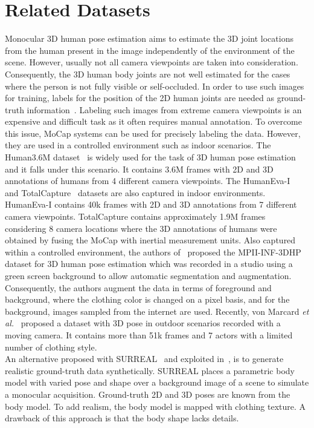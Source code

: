 \documentclass{article}
\begin{document}
\section{Related Datasets}
\label{sec:relateddatasets}
\vspace{-0.1cm}
Monocular 3D human pose estimation aims to estimate the 3D joint locations from the human present in the image independently of the environment of the scene. However, usually not all camera viewpoints are taken into consideration. Consequently, the 3D human body joints are not well estimated for the cases where the person is not fully visible or self-occluded. In order to use such images for training, labels for the position of the 2D human joints are needed as ground-truth information~\cite{andriluka20142d,johnson2010clustered}. Labeling such images from extreme camera viewpoints is an expensive and difficult task as it often requires manual annotation. To overcome this issue, MoCap systems can be used for precisely labeling the data. However, they are used in a controlled environment such as indoor scenarios. The Human3.6M dataset~\cite{h36m_pami} is widely used for the task of 3D human pose estimation and it falls under this scenario. It contains 3.6M frames with 2D and 3D annotations of humans from 4 different camera viewpoints. The HumanEva-I~\cite{sigal2010humaneva} and TotalCapture~\cite{trumble2017total} datasets are also captured in indoor environments. HumanEva-I contains 40k frames with 2D and 3D annotations from 7 different camera viewpoints. TotalCapture contains approximately 1.9M frames considering 8 camera locations where the 3D annotations of humans were obtained by fusing the MoCap with inertial measurement units. Also captured within a controlled environment, the authors of~\cite{mono-3dhp2017} proposed the MPII-INF-3DHP dataset for 3D human pose estimation which was recorded in a studio using a green screen background to allow automatic segmentation and augmentation. Consequently, the authors augment the data in terms of foreground and background, where the clothing color is changed on a pixel basis, and for the background, images sampled from the internet are used. Recently, von Marcard \textit{et al.}~\cite{vonMarcard2018} proposed a dataset with 3D pose in outdoor scenarios recorded with a moving camera. It contains more than 51k frames and 7 actors with a limited number of clothing style. \\
An alternative proposed with SURREAL~\cite{varol2017learning} and exploited in~\cite{pavlakos2018learning}, is to generate realistic ground-truth data synthetically. SURREAL places a parametric body model with varied pose and shape over a background image of a scene to simulate a monocular acquisition. Ground-truth 2D and 3D poses are known from the body model. To add realism, the body model is mapped with clothing texture. A drawback of this approach is that the body shape lacks details.\\
\end{document}
